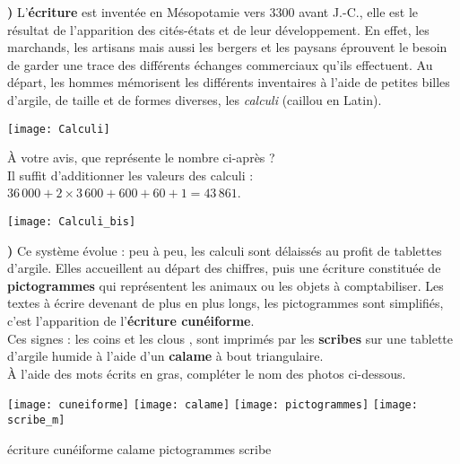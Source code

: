 \documentclass[12pt,a4paper]{article}
\newcommand{\babun}{{\AKK\dish}}
\newcommand{\babdix}{{\AKK\AKKu}}
\begin{document}
{\bf{})} L’{\bf écriture} est inventée en Mésopotamie vers 3300 avant J.-C., elle est le résultat de l’apparition des cités-états et de leur développement. En effet, les marchands, les artisans mais aussi les bergers et les paysans éprouvent le besoin de garder une trace des différents échanges commerciaux qu’ils effectuent. Au départ, les hommes mémorisent les différents inventaires à l’aide de petites billes d’argile, de taille et de formes diverses, les {\it calculi} (caillou en Latin).

\begin{center}
   \texttt{[image: Calculi]}
\end{center}

\begin{minipage}{9cm}
   À votre avis, que représente le nombre ci-après ? \\ [3mm]
   {\red Il suffit d'additionner les valeurs des calculi : \\ [3mm]
   $36\,000+2\times3\,600+600+60+1 =43\,861$.}  \\ [3mm]
\end{minipage}
\;
\begin{minipage}{7.5cm}
   \texttt{[image: Calculi\_bis]}
\end{minipage}

\pagebreak
\thispagestyle{empty}

{\bf{})} Ce système évolue : peu à peu, les  calculi sont délaissés au profit de tablettes d’argile. Elles accueillent au départ des chiffres, puis une écriture constituée de {\bf pictogrammes} qui représentent les animaux ou les objets à comptabiliser. Les textes à écrire devenant de plus en plus longs, les pictogrammes sont simplifiés, c'est l’apparition de l'{\bf écriture cunéiforme}. \\
Ces signes : les coins \babdix et les clous \babun, sont imprimés par les {\bf scribes} sur une tablette d’argile humide à l’aide d’un {\bf calame} à bout triangulaire. \\
À l'aide des mots écrits en gras, compléter le nom des photos ci-dessous.
\begin{center}
   \texttt{[image: cuneiforme]} \qquad \texttt{[image: calame]} \qquad \texttt{[image: pictogrammes]} \qquad \texttt{[image: scribe\_m]}
\end{center}
   {\red \quad écriture cunéiforme \hfill calame \qquad \hfill pictogrammes \hfill \quad scribe \hfill} \\
\end{document}
